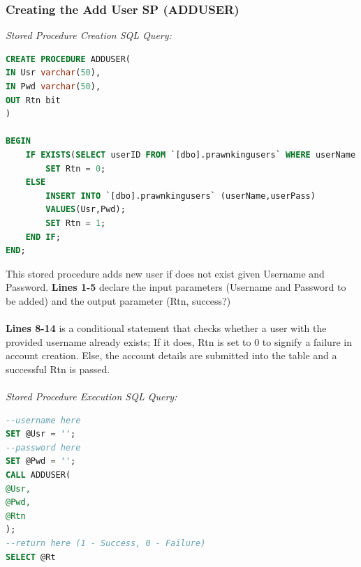 \documentclass[a4paper,11pt]{proc}
\begin{document}
\subsubsection{Creating the Add User SP (ADDUSER)}
\textit{Stored Procedure Creation SQL Query:}
\begin{lstlisting}[language=SQL,
deletekeywords={IDENTITY,INT},
morekeywords={clustered,OUT, BEGIN, PROCEDURE},    
framesep=10pt,
framextopmargin=10pt]
CREATE PROCEDURE ADDUSER(
IN Usr varchar(50),
IN Pwd varchar(50),
OUT Rtn bit
)

BEGIN
	IF EXISTS(SELECT userID FROM `[dbo].prawnkingusers` WHERE userName = Usr) THEN
		SET Rtn = 0;
	ELSE
		INSERT INTO `[dbo].prawnkingusers` (userName,userPass)
		VALUES(Usr,Pwd);
		SET Rtn = 1;
	END IF;
END;
\end{lstlisting}
This stored procedure adds new user if does not exist given Username and Password. \textbf{Lines 1-5} declare the input parameters (Username and Password to be added) and the output parameter (Rtn, success?)\\
\\\textbf{Lines 8-14} is a conditional statement that checks whether a user with the provided username already exists; If it does, Rtn is set to 0 to signify a failure in account creation. Else, the account details are submitted into the table and a successful Rtn is passed.\\
\\\textit{Stored Procedure Execution SQL Query:}
\begin{lstlisting}[language=SQL,
deletekeywords={IDENTITY,INT},
morekeywords={clustered,OUT, BEGIN, PROCEDURE,CALL},    
framesep=10pt,
framextopmargin=10pt]
--username here
SET @Usr = '';
--password here
SET @Pwd = '';
CALL ADDUSER(
@Usr,
@Pwd,
@Rtn
);
--return here (1 - Success, 0 - Failure)
SELECT @Rt
\end{lstlisting}
\end{document}
